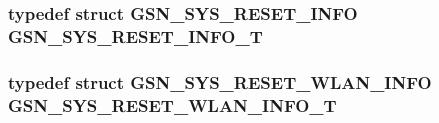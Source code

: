 \label{a00594_aea86e9069b25443b95feb725c7c647a9}
\hypertarget{a00594_aea2dc1fe4318fc9bc687d85a312f3c43}{
\subsubsection[{GSN\_\-SYS\_\-RESET\_\-INFO\_\-T}]{\setlength{\rightskip}{0pt plus 5cm}typedef struct {\bf GSN\_\-SYS\_\-RESET\_\-INFO} {\bf GSN\_\-SYS\_\-RESET\_\-INFO\_\-T}}}
\label{a00594_aea2dc1fe4318fc9bc687d85a312f3c43}
\hypertarget{a00594_a106991c129bd30cf0dcffadf0215d533}{
\subsubsection[{GSN\_\-SYS\_\-RESET\_\-WLAN\_\-INFO\_\-T}]{\setlength{\rightskip}{0pt plus 5cm}typedef struct {\bf GSN\_\-SYS\_\-RESET\_\-WLAN\_\-INFO} {\bf GSN\_\-SYS\_\-RESET\_\-WLAN\_\-INFO\_\-T}}}
\label{a00594_a106991c129bd30cf0dcffadf0215d533}


